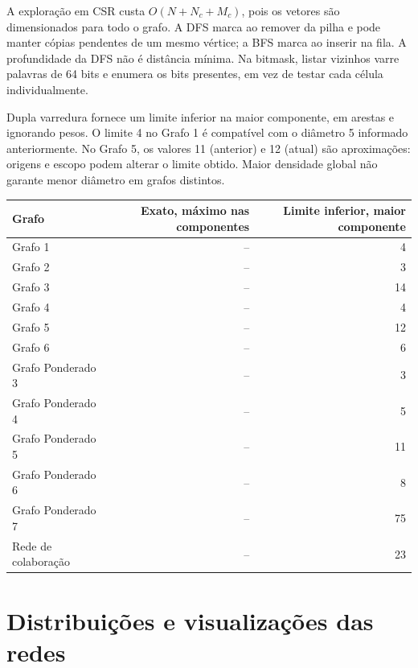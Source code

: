 \documentclass[a4paper,12pt]{article}
\begin{document}
A exploração em CSR custa $O(N+N_c+M_c)$, pois os vetores são dimensionados para todo o grafo. A DFS marca ao remover da pilha e pode manter cópias pendentes de um mesmo vértice; a BFS marca ao inserir na fila. A profundidade da DFS não é distância mínima. Na bitmask, listar vizinhos varre palavras de 64 bits e enumera os bits presentes, em vez de testar cada célula individualmente.

Dupla varredura fornece um limite inferior na maior componente, em arestas e ignorando pesos. O limite 4 no Grafo 1 é compatível com o diâmetro 5 informado anteriormente. No Grafo 5, os valores 11 (anterior) e 12 (atual) são aproximações: origens e escopo podem alterar o limite obtido. Maior densidade global não garante menor diâmetro em grafos distintos.
\par\smallskip\noindent\begin{minipage}{\textwidth}\centering
\begingroup\fontsize{8.8}{11}\selectfont
\setlength{\tabcolsep}{4pt}
\begin{tabular}{lrr}
\toprule
Grafo & Exato, máximo nas componentes & Limite inferior, maior componente \\
\midrule
Grafo 1 & -- & \num{4} \\
Grafo 2 & -- & \num{3} \\
Grafo 3 & -- & \num{14} \\
Grafo 4 & -- & \num{4} \\
Grafo 5 & -- & \num{12} \\
Grafo 6 & -- & \num{6} \\
Grafo Ponderado 3 & -- & \num{3} \\
Grafo Ponderado 4 & -- & \num{5} \\
Grafo Ponderado 5 & -- & \num{11} \\
Grafo Ponderado 6 & -- & \num{8} \\
Grafo Ponderado 7 & -- & \num{75} \\
Rede de colaboração & -- & \num{23} \\
\bottomrule
\end{tabular}
\endgroup
\end{minipage}\par\smallskip
\clearpage\section{Distribuições e visualizações das redes}
\end{document}
